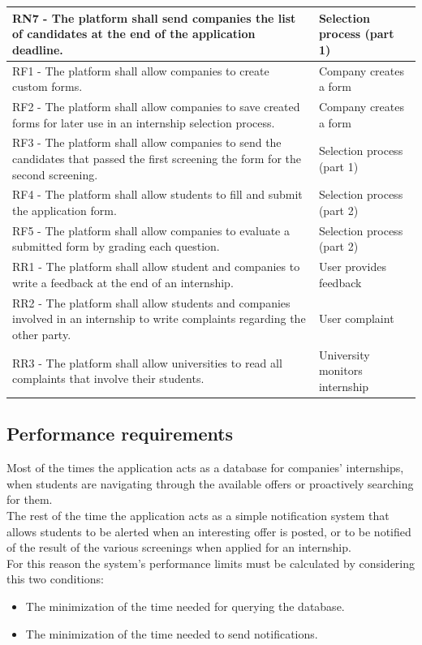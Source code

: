 \documentclass[11pt,twoside]{article}
\begin{document}
\begin{table}[H]
\begin{tabular}{| >{\arraybackslash}m{} | >{\centering\arraybackslash}m{} |}
\hline
RN7 - The platform shall send companies the list of candidates at the end of the application deadline. & Selection process (part 1) \\
\hline
RF1 - The platform shall allow companies to create custom forms. & Company creates a form \\
\hline
RF2 - The platform shall allow companies to save created forms for later use in an internship selection process. & Company creates a form \\
\hline
RF3 - The platform shall allow companies to send the candidates that passed the first screening the form for the second screening. & Selection process (part 1) \\
\hline
RF4 - The platform shall allow students to fill and submit the application form. & Selection process (part 2) \\
\hline
RF5 - The platform shall allow companies to evaluate a submitted form by grading each question. & Selection process (part 2) \\
\hline
RR1 - The platform shall allow student and companies to write a feedback at the end of an internship. & User provides feedback \\
\hline
RR2 - The platform shall allow students and companies involved in an internship to write complaints regarding the other party. & User complaint \\
\hline
RR3 - The platform shall allow universities to read all complaints that involve their students. & University monitors internship \\
\hline
\end{tabular}
\end{table}

\newpage

	\subsection{Performance requirements}

Most of the times the application acts as a database for companies' internships, when students are navigating through the available offers or proactively searching for them. \\
The rest of the time the application acts as a simple notification system that allows students to be alerted when an interesting offer is posted, or to be notified of the result of the various screenings when applied for an internship. \\
For this reason the system's performance limits must be calculated by considering this two conditions: 
\begin{itemize}
\item The minimization of the time needed for querying the database.
\item The minimization of the time needed to send notifications.
\end{itemize}
	
\end{document}
